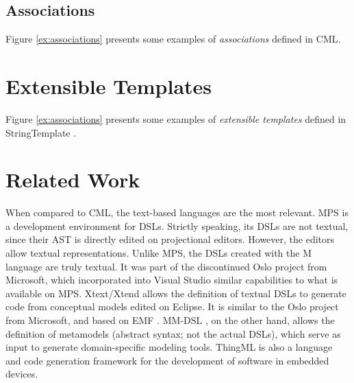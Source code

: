 \documentclass[a0,portrait]{a0poster}
\makeatletter
\newcommand{\verbatimfont}[1]{\renewcommand{\verbatim@font}{\ttfamily#1}}
\makeatother
\begin{document}
\begin{multicols}{3}
\subsection*{Associations}

Figure \ref{ex:associations} presents some examples of \emph{associations} defined in CML.

\begin{center}
\verbatimfont{\small}

\label{ex:associations}
\end{center}


\section*{Extensible Templates}

Figure \ref{ex:associations} presents some examples of
\emph{extensible templates} defined in StringTemplate \cite{st}.

\begin{center}
\verbatimfont{\scriptsize}
\begin{minipage}{\linewidth}

\end{minipage}
\label{ex:templates1}
\end{center}


\color{SaddleBrown} %

\section*{Related Work}

When compared to CML, the text-based languages are the most relevant.
MPS \cite{voelter} is a development environment for DSLs.
Strictly speaking, its DSLs are not textual,
since their AST is directly edited on projectional editors.
However, the editors allow textual representations.
Unlike MPS,
the DSLs created with the M language \cite{mlang} are truly textual.
It was part of the discontinued Oslo project from Microsoft,
which incorporated into Visual Studio similar capabilities to what is available on MPS.
Xtext/Xtend \cite{xtext} allows the definition of textual DSLs
to generate code from conceptual models edited on Eclipse.
It is similar to the Oslo project from Microsoft,
and based on EMF \cite{emf}.
MM-DSL \cite{mm-dsl}, on the other hand,
allows the definition of metamodels (abstract syntax; not the actual DSLs),
which serve as input to generate domain-specific modeling tools.
ThingML \cite{thingml} is also a language and code generation framework for
the development of software in embedded devices.


\end{multicols}
\end{document}
